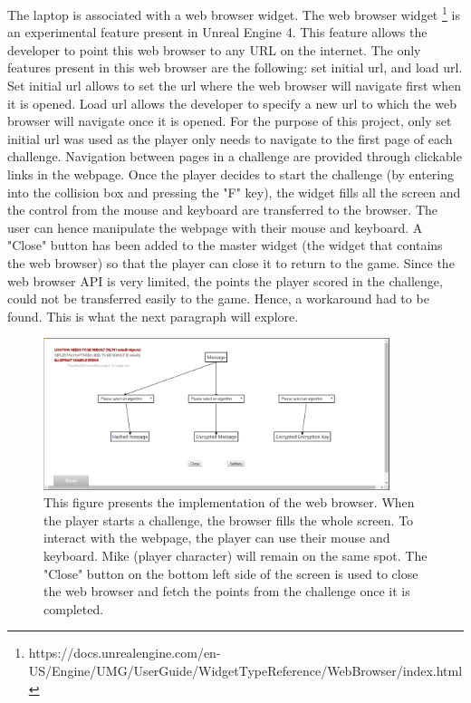 \documentclass{l4proj}
\begin{document}
The laptop is associated with a web browser widget. 
The web browser widget \footnote{https://docs.unrealengine.com/en-US/Engine/UMG/UserGuide/WidgetTypeReference/WebBrowser/index.html} 
is an experimental feature present in Unreal Engine 4.
This feature allows the developer to point this web browser to any URL on the internet.
The only features present in this web browser are the following: set initial url, and load url.
Set initial url allows to set the url where the web browser will navigate first when it is opened.
Load url allows the developer to specify a new url to which the web browser will navigate once it is opened.
For the purpose of this project, only set initial url was used as the player only needs to navigate to the first page of each challenge.
Navigation between pages in a challenge are provided through clickable links in the webpage.
Once the player decides to start the challenge (by entering into the collision box and pressing the "F" key), 
the widget fills all the screen and the control from the mouse and keyboard are transferred to the browser.
The user can hence manipulate the webpage with their mouse and keyboard. 
A "Close" button has been added to the master widget (the widget that contains the web browser) so that
the player can close it to return to the game.
Since the web browser API is very limited, the points the player scored in the challenge, 
could not be transferred easily to the game. Hence, a workaround had to be found.
This is what the next paragraph will explore.

\begin{figure}[]
    \centering
    \includegraphics[width=0.9\textwidth, frame]{images/WebBrowserDesign.PNG}
    \caption{This figure presents the implementation of the web browser. 
    When the player starts a challenge, the browser fills the whole screen.
    To interact with the webpage, the player can use their mouse and keyboard.
    Mike (player character) will remain on the same spot.
    The "Close" button on the bottom left side of the screen is used to close the web
    browser and fetch the points from the challenge once it is completed.}
    \label{fig:WebBrowser}
\end{figure}
\end{document}
